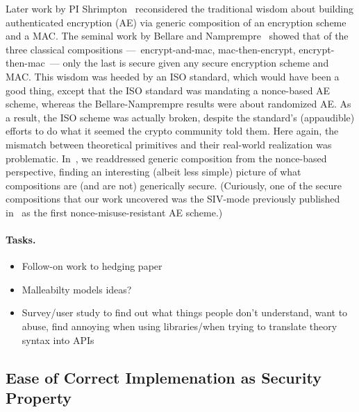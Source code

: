 Later work by PI Shrimpton~\cite{NRS} reconsidered the traditional wisdom about
building authenticated encryption (AE) via generic composition of an encryption
scheme and a MAC.   The seminal work by Bellare and Namprempre~\cite{BN} showed
that of the three classical compositions ---~encrypt-and-mac, mac-then-encrypt,
encrypt-then-mac~--- only the last is secure given any secure encryption scheme
and MAC.   This wisdom was heeded by an ISO standard, which would have been a
good thing, except that the ISO standard was mandating a nonce-based AE scheme,
whereas the Bellare-Namprempre results were about randomized AE.  As a result,
the ISO scheme was actually broken, despite the standard's (appaudible) efforts
to do what it seemed the crypto community told them.  Here again, the mismatch
between theoretical primitives and their real-world realization was problematic.
In~\cite{NRS}, we readdressed generic composition from the nonce-based
perspective, finding an interesting (albeit less simple) picture of what
compositions are (and are not) generically secure.  (Curiously, one of the
secure compositions that our work uncovered was the SIV-mode previously
published in~\cite{RS06} as the first nonce-misuse-resistant AE scheme.)


\paragraph{Tasks.}
\begin{itemize}
\item {Follow-on work to hedging paper}
\item {Malleabilty models ideas?}
\item {Survey/user study to find out what things people don't
    understand, want to abuse, find annoying when using libraries/when
  trying to translate theory syntax into APIs}
\end{itemize}
\subsection{Ease of Correct Implemenation as Security Property}

